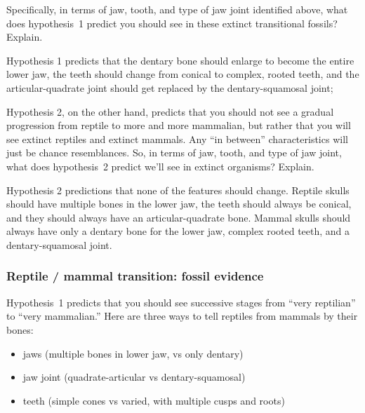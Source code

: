 \documentclass[12pt, hidelinks]{exam}
\newcommand*\AnswerBox[2]{%
    \parbox[t][#1]{0.92\textwidth}{%
    \begin{solution}#2\end{solution}}
    \vspace{\stretch{1}}
}
\begin{document}
\begin{questions}
\question
Specifically, in terms of jaw, tooth, and type of jaw joint identified above, what does hypothesis~1 predict you should see in these extinct transitional fossils?  Explain.

\AnswerBox{6\baselineskip}{%
Hypothesis 1 predicts that the dentary bone should enlarge to become the entire lower jaw, the teeth should change from conical to complex, rooted teeth, and the articular-quadrate joint should get replaced by the dentary-squamosal joint; 
}


\question
Hypothesis 2, on the other hand, predicts that you should not see a gradual progression from reptile to more and more mammalian, but rather that you will see extinct reptiles and extinct mammals.  Any ``in between'' characteristics will just be chance resemblances.  So, in terms of jaw, tooth,  and type of jaw joint, what does hypothesis~2 predict we'll see in extinct organisms?  Explain.

\AnswerBox{6\baselineskip}{%
Hypothesis 2 predictions that none of the features should change. Reptile skulls should have multiple bones in the lower jaw, the teeth should always be conical, and they should always have an articular-quadrate bone. Mammal skulls should always have only a dentary bone for the lower jaw, complex rooted teeth, and a dentary-squamosal joint.}

\newpage

\subsubsection*{Reptile / mammal transition: fossil evidence}

Hypothesis~1 predicts that you should see successive stages from ``very reptilian'' to
``very mammalian.'' Here are three ways to tell reptiles from mammals by their bones:



\begin{itemize}
\item
  jaws (multiple bones in lower jaw, vs only dentary)
\item
  jaw joint (quadrate-articular vs dentary-squamosal)
\item
  teeth (simple cones vs varied, with multiple cusps and roots)
\end{itemize}


\end{questions}
\end{document}

